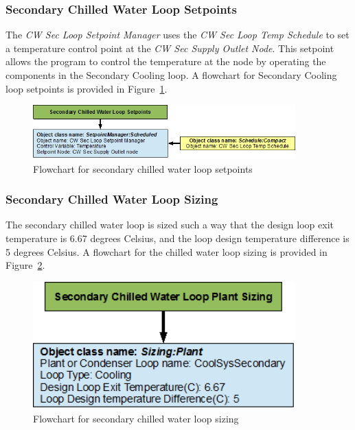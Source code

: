 \subsubsection{Secondary Chilled Water Loop Setpoints}\label{secondary-chilled-water-loop-setpoints}

The \emph{CW Sec Loop Setpoint Manager} uses the \emph{CW Sec Loop Temp Schedule} to set a temperature control point at the \emph{CW Sec Supply Outlet Node}. This setpoint allows the program to control the temperature at the node by operating the components in the Secondary Cooling loop. A flowchart for Secondary Cooling loop setpoints is provided in Figure~\ref{fig:flowchart-for-secondary-chilled-water-loop-setpoints}.

\begin{figure}[hbtp] %
\centering
\includegraphics[width=0.9\textwidth, height=0.9\textheight, keepaspectratio=true]{media/image114.png}
\caption{Flowchart for secondary chilled water loop setpoints \protect \label{fig:flowchart-for-secondary-chilled-water-loop-setpoints}}
\end{figure}

\subsubsection{Secondary Chilled Water Loop Sizing}\label{secondary-chilled-water-loop-sizing}

The secondary chilled water loop is sized such a way that the design loop exit temperature is 6.67 degrees Celsius, and the loop design temperature difference is 5 degrees Celsius. A flowchart for the chilled water loop sizing is provided in Figure~\ref{fig:flowchart-for-secondary-chilled-water-loop-sizing}.

\begin{figure}[hbtp] %
\centering
\includegraphics[width=0.9\textwidth, height=0.9\textheight, keepaspectratio=true]{media/image115.png}
\caption{Flowchart for secondary chilled water loop sizing \protect \label{fig:flowchart-for-secondary-chilled-water-loop-sizing}}
\end{figure}
